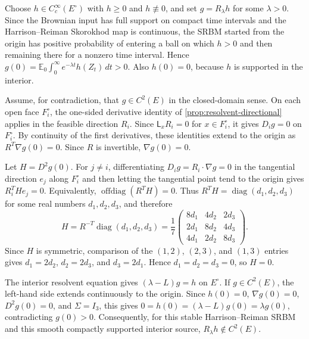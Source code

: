 \documentclass[aihp]{imsart}
\numberwithin{equation}{section}
\theoremstyle{plain}
\theoremstyle{definition}
\newcommand{\diag}{\operatorname{diag}}
\newcommand{\1}{\mathbf 1}
\begin{document}
\begin{appendix}
Choose $h\in C_c^\infty(E^\circ)$ with $h\ge0$ and $h\not\equiv0$, and set $g=R_\lambda h$ for some $\lambda>0$.  Since the Brownian input has full support on compact time intervals and the Harrison--Reiman Skorokhod map is continuous, the SRBM started from the origin has positive probability of entering a ball on which $h>0$ and then remaining there for a nonzero time interval.  Hence $g(0)=\mathbb E_0\int_0^\infty e^{-\lambda t}h(Z_t)\,dt>0$.  Also $h(0)=0$, because $h$ is supported in the interior.

Assume, for contradiction, that $g\in C^2(E)$ in the closed-domain sense.  On each open face $F_i^\circ$, the one-sided derivative identity of \cref{prop:resolvent-directional} applies in the feasible direction $R_i$.  Since $\mathsf L_xR_i=0$ for $x\in F_i^\circ$, it gives $D_i g=0$ on $F_i^\circ$.  By continuity of the first derivatives, these identities extend to the origin as $R^T\nabla g(0)=0$.  Since $R$ is invertible, $\nabla g(0)=0$.

Let $H=D^2g(0)$.  For $j\ne i$, differentiating $D_i g=R_i\cdot\nabla g=0$ in the tangential direction $e_j$ along $F_i^\circ$ and then letting the tangential point tend to the origin gives $R_i^THe_j=0$.  Equivalently, $\operatorname{offdiag}(R^TH)=0$.  Thus $R^TH=\diag(d_1,d_2,d_3)$ for some real numbers $d_1,d_2,d_3$, and therefore
\[
        H=R^{-T}\diag(d_1,d_2,d_3)
        =\frac17
        \begin{pmatrix}
        8d_1&4d_2&2d_3\\
        2d_1&8d_2&4d_3\\
        4d_1&2d_2&8d_3
        \end{pmatrix}.
\]
Since $H$ is symmetric, comparison of the $(1,2)$, $(2,3)$, and $(1,3)$ entries gives $d_1=2d_2$, $d_2=2d_3$, and $d_3=2d_1$.  Hence $d_1=d_2=d_3=0$, so $H=0$.

The interior resolvent equation gives $(\lambda-L)g=h$ on $E^\circ$.  If $g\in C^2(E)$, the left-hand side extends continuously to the origin.  Since $h(0)=0$, $\nabla g(0)=0$, $D^2g(0)=0$, and $\Sigma=I_3$, this gives $0=h(0)=(\lambda-L)g(0)=\lambda g(0)$, contradicting $g(0)>0$.  Consequently, for this stable Harrison--Reiman SRBM and this smooth compactly supported interior source, $R_\lambda h\notin C^2(E)$.
\end{appendix}



\end{document}

